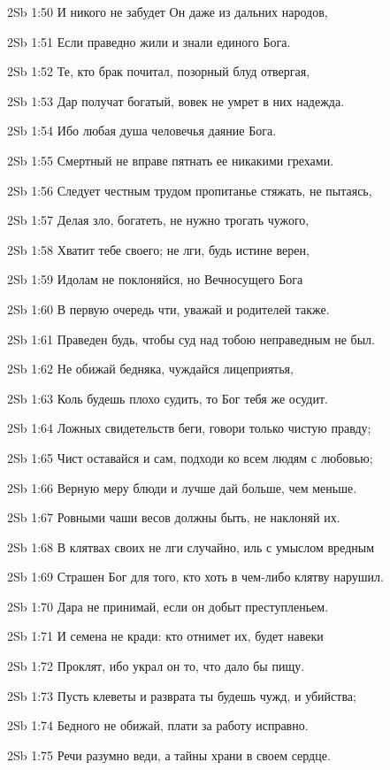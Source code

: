 \vs 2Sb 1:50 И никого не забудет Он даже из дальних народов,

\vs 2Sb 1:51 Если праведно жили и знали единого Бога.

\vs 2Sb 1:52 Те, кто брак почитал, позорный блуд отвергая,

\vs 2Sb 1:53 Дар получат богатый, вовек не умрет в них надежда. 

\vs 2Sb 1:54 Ибо любая душа человечья  даяние Бога.

\vs 2Sb 1:55 Смертный не вправе пятнать ее никакими грехами.

\vs 2Sb 1:56 Следует честным трудом пропитанье стяжать, не пытаясь,

\vs 2Sb 1:57 Делая зло, богатеть, не нужно трогать чужого, 

\vs 2Sb 1:58 Хватит тебе своего; не лги, будь истине верен, 

\vs 2Sb 1:59 Идолам не поклоняйся, но Вечносущего Бога 

\vs 2Sb 1:60 В первую очередь чти, уважай и родителей также. 

\vs 2Sb 1:61 Праведен будь, чтобы суд над тобою неправедным не был. 

\vs 2Sb 1:62 Не обижай бедняка, чуждайся лицеприятья, 

\vs 2Sb 1:63 Коль будешь плохо судить, то Бог тебя же осудит.

\vs 2Sb 1:64 Ложных свидетельств беги, говори только чистую правду; 

\vs 2Sb 1:65 Чист оставайся и сам, подходи ко всем людям с любовью;

\vs 2Sb 1:66 Верную меру блюди и лучше дай больше, чем меньше.

\vs 2Sb 1:67 Ровными чаши весов должны быть, не наклоняй их.

\vs 2Sb 1:68 В клятвах своих не лги  случайно, иль с умыслом вредным 

\vs 2Sb 1:69 Страшен Бог для того, кто хоть в чем-либо клятву нарушил. 

\vs 2Sb 1:70 Дара не принимай, если он добыт преступленьем.

\vs 2Sb 1:71 И семена не кради: кто отнимет их, будет навеки

\vs 2Sb 1:72 Проклят, ибо украл он то, что дало бы пищу.

\vs 2Sb 1:73 Пусть клеветы и разврата ты будешь чужд, и убийства;

\vs 2Sb 1:74 Бедного не обижай, плати за работу исправно. 

\vs 2Sb 1:75 Речи разумно веди, а тайны храни в своем сердце.

